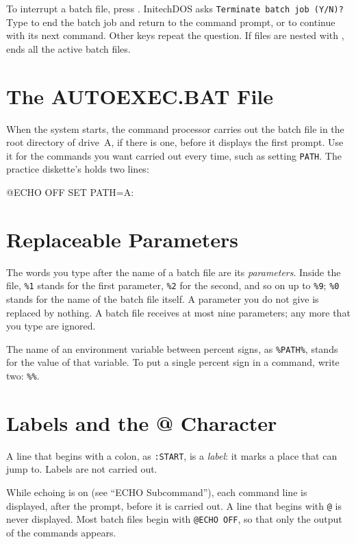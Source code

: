 To interrupt a batch file, press .  InitechDOS asks
\texttt{Terminate batch job (Y/N)?}  Type  to end the batch job
and return to the command prompt, or  to continue with its next
command.  Other keys repeat the question.  If files are nested with
,  ends all the active batch files.

\section{The AUTOEXEC.BAT File}
When the system starts, the command processor carries out the batch file
 in the root directory of drive~A, if there is one, before
it displays the first prompt.  Use it for the commands you want carried out
every time, such as setting \texttt{PATH}.  The practice diskette's
 holds two lines:
\begin{TypeIn}
@ECHO OFF
SET PATH=A:\APPS
\end{TypeIn}

\section{Replaceable Parameters}
The words you type after the name of a batch file are its
\emph{parameters}.  Inside the file, \texttt{\%1} stands for the first
parameter, \texttt{\%2} for the second, and so on up to \texttt{\%9};
\texttt{\%0} stands for the name of the batch file itself.  A parameter you
do not give is replaced by nothing.  A batch file receives at most nine
parameters; any more that you type are ignored.

The name of an environment variable between percent signs, as
\texttt{\%PATH\%}, stands for the value of that variable.  To put a single
percent sign in a command, write two: \texttt{\%\%}.

\section{Labels and the @ Character}
A line that begins with a colon, as \texttt{:START}, is a \emph{label}: it
marks a place that  can jump to.  Labels are not carried out.

While echoing is on (see ``ECHO Subcommand''), each command line is
displayed, after the prompt, before it is carried out.  A line that begins
with \texttt{@} is never displayed.  Most batch files begin with
\texttt{@ECHO OFF}, so that only the output of the commands appears.


